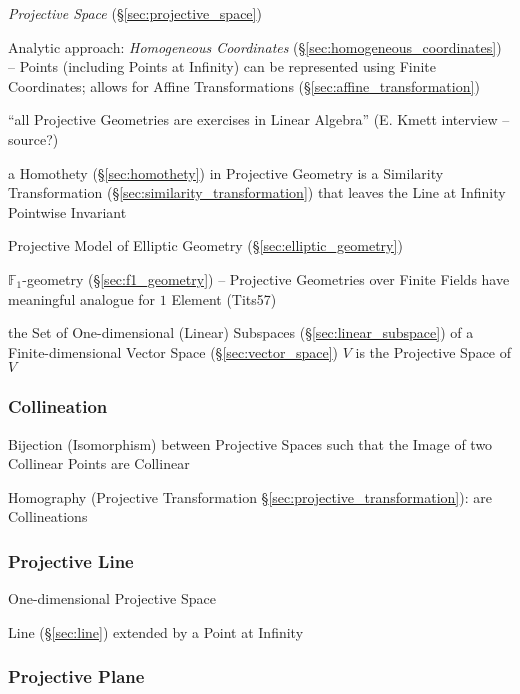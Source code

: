 \emph{Projective Space} (\S\ref{sec:projective_space})

Analytic approach: \emph{Homogeneous Coordinates}
(\S\ref{sec:homogeneous_coordinates}) -- Points (including Points at Infinity)
can be represented using Finite Coordinates; allows for Affine Transformations
(\S\ref{sec:affine_transformation}) %

``all Projective Geometries are exercises in Linear Algebra'' (E.
Kmett interview -- source?) %

a Homothety (\S\ref{sec:homothety}) in Projective Geometry is a Similarity
Transformation (\S\ref{sec:similarity_transformation}) that leaves the Line at
Infinity Pointwise Invariant

Projective Model of Elliptic Geometry (\S\ref{sec:elliptic_geometry})

\fist $\mathbb{F}_1$-geometry (\S\ref{sec:f1_geometry}) -- Projective Geometries
over Finite Fields have meaningful analogue for $1$ Element (Tits57)

\fist the Set of One-dimensional (Linear) Subspaces
(\S\ref{sec:linear_subspace}) of a Finite-dimensional Vector Space
(\S\ref{sec:vector_space}) $V$ is the Projective Space of $V$



\subsubsection{Collineation}\label{sec:collineation}

Bijection (Isomorphism) between Projective Spaces such that the Image of two
Collinear Points are Collinear

\fist Homography (Projective Transformation
\S\ref{sec:projective_transformation}): are Collineations %



\subsubsection{Projective Line}\label{sec:projective_line}

One-dimensional Projective Space

Line (\S\ref{sec:line}) extended by a Point at Infinity



\subsubsection{Projective Plane}\label{sec:projective_plane}

